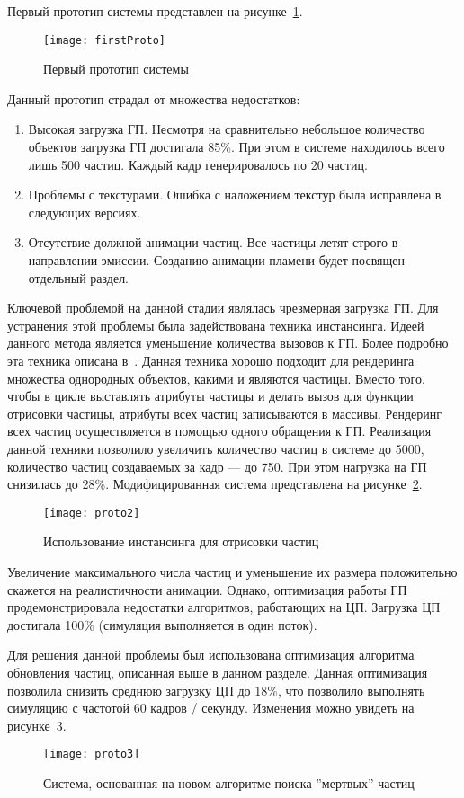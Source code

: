 Первый прототип системы представлен на рисунке~\ref{fig:firstProto}.
\begin{figure}[htb]
	\centering
    \texttt{[image: firstProto]}
    \caption{Первый прототип системы}%
    \label{fig:firstProto}
\end{figure}
Данный прототип страдал от множества недостатков:
\begin{enumerate}
    \item Высокая загрузка ГП. Несмотря на сравнительно небольшое количество
        объектов загрузка ГП достигала 85\%. При этом в системе находилось всего
        лишь 500 частиц. Каждый кадр генерировалось по 20 частиц.
    \item Проблемы с текстурами. Ошибка с наложением текстур была исправлена в
        следующих версиях.
    \item Отсутствие должной анимации частиц. Все частицы летят строго в
        направлении эмиссии. Созданию анимации пламени будет посвящен отдельный
        раздел.
\end{enumerate}

Ключевой проблемой на данной стадии являлась чрезмерная загрузка ГП. Для
устранения этой проблемы была задействована техника инстансинга. Идеей данного
метода является уменьшение количества вызовов к ГП. Более подробно
эта техника описана в~\cite{OGLSuperbible,LearnOGL}. Данная техника хорошо
подходит для рендеринга множества однородных объектов, какими и являются
частицы. Вместо того, чтобы в цикле выставлять атрибуты частицы и делать вызов
для функции отрисовки частицы, атрибуты всех частиц записываются в массивы.
Рендеринг всех частиц осуществляется в помощью одного обращения к ГП. Реализация
данной техники позволило увеличить количество частиц в системе до 5000,
количество частиц создаваемых за кадр --- до 750. При этом нагрузка на ГП
снизилась до 28\%. Модифицированная система представлена на
рисунке~\ref{fig:proto2}.
\begin{figure}[htb]
	\centering
    \texttt{[image: proto2]}
    \caption{Использование инстансинга для отрисовки частиц}%
    \label{fig:proto2}
\end{figure}

Увеличение максимального числа частиц и уменьшение их размера положительно
скажется на реалистичности анимации. Однако, оптимизация работы ГП
продемонстрировала недостатки алгоритмов, работающих на ЦП. Загрузка ЦП
достигала 100\% (симуляция выполняется в один поток).

Для решения данной проблемы был использована оптимизация алгоритма обновления
частиц, описанная выше в данном разделе. Данная оптимизация позволила снизить
среднюю загрузку ЦП до 18\%, что позволило выполнять симуляцию с частотой 60
кадров / секунду. Изменения можно увидеть на рисунке~\ref{fig:proto3}.
\begin{figure}[htb]
	\centering
    \texttt{[image: proto3]}
    \caption{Система, основанная на новом алгоритме поиска ''мертвых'' частиц}%
    \label{fig:proto3}
\end{figure}

